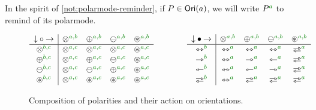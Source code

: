 \documentclass[a4paper]{memoir}
\begin{document}
\begin{notation} \label{not:polarmode-reminder-orientation}
	In the spirit of \cref{not:polarmode-reminder},
	if $P \in {\mathsf{Ori}}(a)$, we will write $P \pmr a$ to remind of its polarmode.
\end{notation}
\begin{figure}[htb]
	\[
		\begin{array}{c | c c c c}
			{\downarrow} \circ {\rightarrow} &
			          \mixpol \pmrhom{a}{b} & \pospol \pmrhom{a}{b} & \negpol \pmrhom{a}{b} & \isopol \pmrhom{a}{b}
			        \\ \hline
			\mixpol \pmrhom{b}{c} & \mixpol \pmrhom{a}{c} & \mixpol \pmrhom{a}{c} & \mixpol \pmrhom{a}{c} & \isopol \pmrhom{a}{c}
			        \\
			\pospol \pmrhom{b}{c} & \mixpol \pmrhom{a}{c} & \pospol \pmrhom{a}{c} & \negpol \pmrhom{a}{c} & \isopol \pmrhom{a}{c}
			        \\
			\negpol \pmrhom{b}{c} & \mixpol \pmrhom{a}{c} & \negpol \pmrhom{a}{c} & \pospol \pmrhom{a}{c} & \isopol \pmrhom{a}{c}
			        \\
			\isopol \pmrhom{b}{c} & \mixpol \pmrhom{a}{c} & \isopol \pmrhom{a}{c} & \isopol \pmrhom{a}{c} & \isopol \pmrhom{a}{c}
			        \\
		\end{array}
		\qquad \qquad
		\begin{array}{c | c c c c}
			{\downarrow} \oriof {\rightarrow} &
			          \mixpol \pmrhom{a}{b} & \pospol \pmrhom{a}{b} & \negpol \pmrhom{a}{b} & \isopol \pmrhom{a}{b}
			        \\ \hline
			\equijetsym \pmr{b} & \equijetsym \pmr{a} & \equijetsym \pmr{a} & \equijetsym \pmr{a} & \infrajetsym \pmr{a}
			        \\
			\jetsym \pmr{b} & \equijetsym \pmr{a} & \jetsym \pmr{a} & \tejsym \pmr{a} & \infrajetsym \pmr{a}
			        \\
			\tejsym \pmr{b} & \equijetsym \pmr{a} & \tejsym \pmr{a} & \jetsym \pmr{a} & \infrajetsym \pmr{a}
			        \\
			\infrajetsym \pmr{b} & \equijetsym \pmr{a} & \infrajetsym \pmr{a} & \infrajetsym \pmr{a} & \infrajetsym \pmr{a}
			        \\
		\end{array}
	\]
	\caption{Composition of polarities and their action on orientations.}
	\label{fig:polarity-orientation}
\end{figure}
\end{document}
